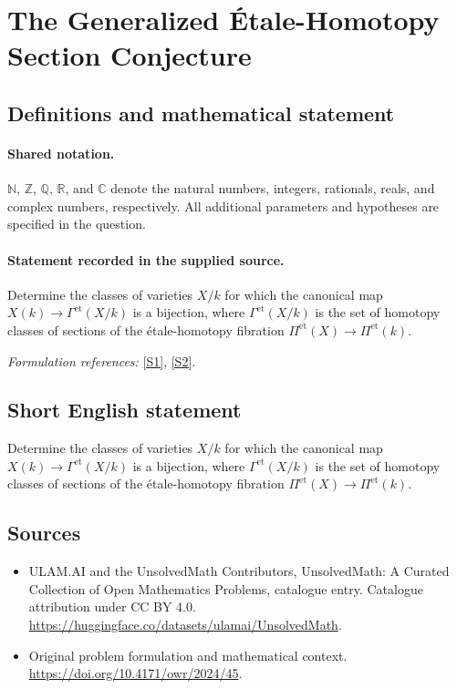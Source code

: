 \documentclass[11pt]{article}
\newcommand{\sref}[2]{\hyperlink{source:#1:#2}{[S#2]}}
\begin{document}
\section{The Generalized Étale-Homotopy Section Conjecture}\label{statement}

\subsection{Definitions and mathematical statement}

\paragraph{Shared notation.}$\mathbb N$, $\mathbb Z$, $\mathbb Q$, $\mathbb R$, and $\mathbb C$ denote the natural numbers, integers, rationals, reals, and complex numbers, respectively. All additional parameters and hypotheses are specified in the question.


\paragraph{Statement recorded in the supplied source.}
Determine the classes of varieties $X/k$ for which the canonical map $X(k)\to\Gamma^{\mathrm{et}}(X/k)$ is a bijection, where $\Gamma^{\mathrm{et}}(X/k)$ is the set of homotopy classes of sections of the étale-homotopy fibration $\Pi^{\mathrm{et}}(X)\to\Pi^{\mathrm{et}}(k)$.
\par\smallskip\textit{Formulation references:} \sref{statement}{1}, \sref{statement}{2}.
\subsection{Short English statement}
Determine the classes of varieties $X/k$ for which the canonical map $X(k)\to\Gamma^{\mathrm{et}}(X/k)$ is a bijection, where $\Gamma^{\mathrm{et}}(X/k)$ is the set of homotopy classes of sections of the étale-homotopy fibration $\Pi^{\mathrm{et}}(X)\to\Pi^{\mathrm{et}}(k)$.
\subsection{Sources}
\begin{itemize}
\item[\hypertarget{source:statement:1}{S1}] ULAM.AI and the UnsolvedMath Contributors, UnsolvedMath: A Curated Collection of Open Mathematics Problems, catalogue entry. Catalogue attribution under CC BY 4.0.
\url{https://huggingface.co/datasets/ulamai/UnsolvedMath}.
\item[\hypertarget{source:statement:2}{S2}] Original problem formulation and mathematical context.
\url{https://doi.org/10.4171/owr/2024/45}.
\end{itemize}
\label{end:statement}
\end{document}
